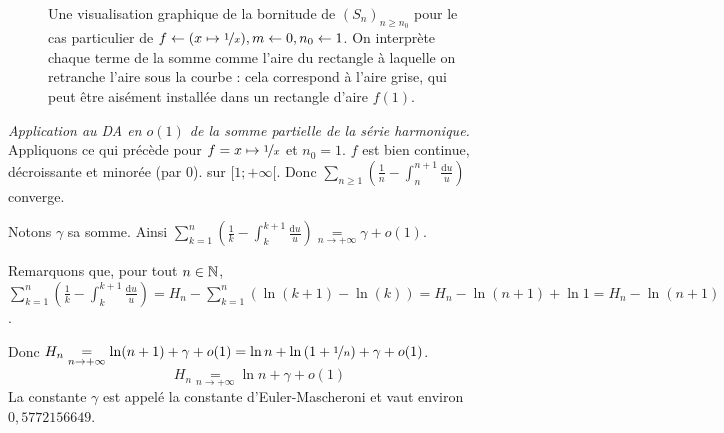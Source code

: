 \documentclass{article}
\renewenvironment{question_kholle}[2][ ]
{
	\subsection{\texorpdfstring{#2}{}}
	\notblank{#1}
	{
		\noindent #1
		\bigbreak
	}
	{}
	\begin{proof}
}
{
	\end{proof}
}
\begin{document}
\begin{question_kholle}
\begin{figure}[H]
      \caption{Une visualisation graphique de la bornitude de $(S_n)_{n \geqslant n_0}$ pour le cas particulier de $f \leftarrow (x \mapsto \nicefrac 1 x), m \leftarrow 0, n_0 \leftarrow 1$. On interprète chaque terme de la somme comme l'aire du rectangle à laquelle on retranche l'aire sous la courbe : cela correspond à l'aire grise, qui peut être aisément installée dans un rectangle d'aire $f(1)$.}
  \end{figure}

  \textit{Application au DA en $o(1)$ de la somme partielle de la série harmonique.}
  Appliquons ce qui précède pour $f = x \mapsto \nicefrac{1}{x}$ et $n_0 = 1$. $f$ est bien continue, décroissante et minorée (par 0). sur $[1; + \infty[$.
  Donc $\displaystyle \sum_{ n \geqslant 1} \left( \frac{1}{n} - \int_{n}^{n+1} \frac{\mathrm du}{u} \right)$ converge.

  Notons $\gamma$ sa somme. Ainsi $\displaystyle \sum_{k=1}^{n} \left( \frac{1}{k} - \int_{k}^{k+1} \frac{\mathrm du}{u} \right) \underset{n \to +\infty}{=} \gamma + o(1)$.

  Remarquons que, pour tout $n \in \mathbb N$,
  $\displaystyle \sum_{k=1}^{n} \left( \frac{1}{k} - \int_{k}^{k+1} \frac{\mathrm du}{u} \right)
    = H_n - \sum_{k=1}^{n} \left( \ln(k+1) - \ln(k) \right)
    = H_n - \ln(n+1) + \ln 1
    = H_n - \ln(n+1)$.

  Donc $H_n \underset{n \to +\infty}{=} \ln(n+1) + \gamma + o(1) = \ln n + \ln \left( 1 + \nicefrac{1}{n} \right) + \gamma + o(1)$.
  \begin{equation*}
    H_n \underset{n \to +\infty}{=} \ln n + \gamma + o(1)
  \end{equation*}
  La constante $\gamma$ est appelé la constante d'Euler-Mascheroni et vaut environ $0,5772156649$.
\end{question_kholle}
\end{document}
